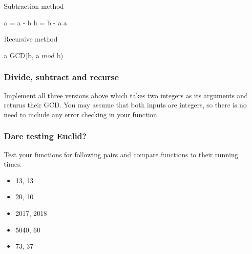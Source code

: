 \documentclass[a4paper]{article}
\begin{document}
\begin{algorithm}
    \caption{Subtraction method}
    \begin{algorithmic}[1]
                    \State a = a - b
                \Else
                    \State b = b - a
                \EndIf
            \EndWhile
            \State \Return a
        \EndFunction
    \end{algorithmic}
\end{algorithm}


\begin{algorithm}
    \caption{Recursive method}
    \begin{algorithmic}[1]
                \State \Return a
            \Else
                \State \Return GCD(b, a $ mod $ b)
            \EndIf
        \EndFunction
    \end{algorithmic}
\end{algorithm}

\subsubsection{Divide, subtract and recurse} Implement all three versions above which takes
two integers as its arguments and returns their GCD. You may assume that both
inputs are integers, so there is no need to include any error checking in your function.

\subsubsection{Dare testing Euclid?} Test your functions for following pairs and compare functions to their running times.

\begin{itemize}
    \item 13, 13
    \item 20, 10
    \item 2017, 2018
    \item 5040, 60
    \item 73, 37
\end{itemize}

\newpage
\end{document}
